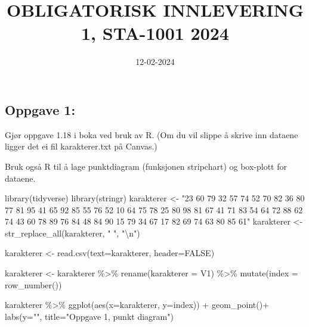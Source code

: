 \documentclass[
  12pt,
  a4paper,
  DIV=11,
  numbers=noendperiod]{scrartcl}
\title{OBLIGATORISK INNLEVERING 1, STA-1001 2024}
\author{}
\date{12-02-2024}
\newenvironment{Shaded}{\begin{snugshade}}{\end{snugshade}}
\newcommand{\AttributeTok}[1]{\textcolor[rgb]{0.40,0.45,0.13}{#1}}
\newcommand{\ConstantTok}[1]{\textcolor[rgb]{0.56,0.35,0.01}{#1}}
\newcommand{\FunctionTok}[1]{\textcolor[rgb]{0.28,0.35,0.67}{#1}}
\newcommand{\NormalTok}[1]{\textcolor[rgb]{0.00,0.23,0.31}{#1}}
\newcommand{\OtherTok}[1]{\textcolor[rgb]{0.00,0.23,0.31}{#1}}
\newcommand{\SpecialCharTok}[1]{\textcolor[rgb]{0.37,0.37,0.37}{#1}}
\newcommand{\StringTok}[1]{\textcolor[rgb]{0.13,0.47,0.30}{#1}}
\renewcommand*\contentsname{Table of contents}
\newcommand\contentsname{Table of contents}
\begin{document}
\maketitle
\begin{abstract}
\hfill\break
\hfill\break
\hfill\break
\hfill\break
\hfill\break
\hfill\break
\hfill\break
\hfill\break
\hfill\break
\hfill\break
\hfill\break
\hfill\break
\hfill\break
\hfill\break
\hfill\break
\hfill\break
\hfill\break
\hfill\break
\hfill\break
\hfill\break
\hfill\break
\hfill\break
\hfill\break
\hfill\break
\hfill\break
\hfill\break
\hfill\break
\hfill\break
\hfill\break
\hfill\break
\hfill\break
\end{abstract}

\renewcommand*\contentsname{Innholdsfortegnelse}
{
\hypersetup{linkcolor=black}
\setcounter{tocdepth}{3}
\tableofcontents
}
\clearpage

\subsection{Oppgave 1:}\label{oppgave-1}

Gjør oppgave 1.18 i boka ved bruk av R. (Om du vil slippe å skrive inn
dataene ligger det ei fil karakterer.txt på Canvas.)

Bruk også R til å lage punktdiagram (funksjonen stripchart) og box-plott
for dataene.

\begin{Shaded}
\begin{Highlighting}[]
\FunctionTok{library}\NormalTok{(tidyverse)}
\FunctionTok{library}\NormalTok{(stringr)}
\NormalTok{karakterer }\OtherTok{\textless{}{-}} \StringTok{"23 60 79 32 57 74 52 70 82 36 80 77 81 95 41 65 92 85 55 76 52 10 64 75 78 25 80 98 81 67 41 71 83 54 64 72 88 62 74 43 60 78 89 76 84 48 84 90 15 79 34 67 17 82 69 74 63 80 85 61"}
\NormalTok{karakterer }\OtherTok{\textless{}{-}} \FunctionTok{str\_replace\_all}\NormalTok{(karakterer, }\StringTok{" "}\NormalTok{, }\StringTok{"}\SpecialCharTok{\textbackslash{}n}\StringTok{"}\NormalTok{)}


\NormalTok{karakterer }\OtherTok{\textless{}{-}} \FunctionTok{read.csv}\NormalTok{(}\AttributeTok{text=}\NormalTok{karakterer, }\AttributeTok{header=}\ConstantTok{FALSE}\NormalTok{) }

\NormalTok{karakterer }\OtherTok{\textless{}{-}}\NormalTok{ karakterer }\SpecialCharTok{\%\textgreater{}\%} 
  \FunctionTok{rename}\NormalTok{(}\AttributeTok{karakterer =}\NormalTok{ V1) }\SpecialCharTok{\%\textgreater{}\%} 
  \FunctionTok{mutate}\NormalTok{(}\AttributeTok{index =} \FunctionTok{row\_number}\NormalTok{())}


\NormalTok{karakterer }\SpecialCharTok{\%\textgreater{}\%} 
  \FunctionTok{ggplot}\NormalTok{(}\FunctionTok{aes}\NormalTok{(}\AttributeTok{x=}\NormalTok{karakterer, }\AttributeTok{y=}\NormalTok{index)) }\SpecialCharTok{+} 
  \FunctionTok{geom\_point}\NormalTok{()}\SpecialCharTok{+}
  \FunctionTok{labs}\NormalTok{(}\AttributeTok{y=}\StringTok{""}\NormalTok{, }\AttributeTok{title=}\StringTok{"Oppgave 1, punkt diagram"}\NormalTok{)}
\end{Highlighting}
\end{Shaded}
\end{document}
